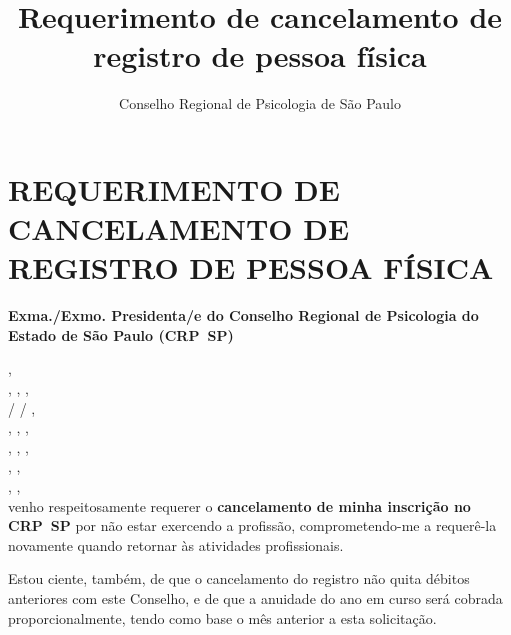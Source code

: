 \documentclass[openright, oneside, a4paper, article, brazil]{abntex2}
\title{Requerimento de cancelamento de registro de pessoa física}
\author{Conselho Regional de Psicologia de São Paulo}
\begin{document}
\pagestyle{crp}
\centering
\Form
\section{REQUERIMENTO DE CANCELAMENTO DE REGISTRO DE PESSOA FÍSICA}%

\textbf{Exma./Exmo. Presidenta/e do Conselho Regional de Psicologia do Estado de São Paulo (CRP~SP)}
\vspace{\baselineskip}

\setasuspacing{\DoubleSpacing}
 \hfill,\\%
 , \hfill%
 , %
 \hfill,\\%
 /  /  ,\hfill %
\\
 , \hfill%
 ,\hfill%
 ,\\%
 , %
 ,\hfill%
 , \\%
 , \hfill%
 ,\\%
 , %
 ,\\
\setasuspacing{\OnehalfSpacing}\noindent\justifying
venho respeitosamente requerer o \textbf{cancelamento de minha inscrição no CRP~SP} por não estar exercendo a profissão, comprometendo-me a requerê-la novamente quando retornar às atividades profissionais.

Estou ciente, também, de que o cancelamento do registro não quita débitos anteriores com este Conselho, e de que a anuidade do ano em curso será cobrada proporcionalmente, tendo como base o mês anterior a esta solicitação.
\end{document}

